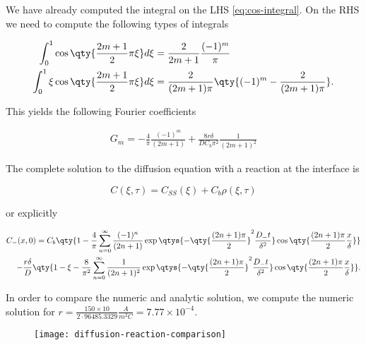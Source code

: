 We have already computed the integral on the LHS \ref{eq:cos-integral}. On the RHS we need to compute the following types of integrals

\begin{align}
	\int_0^1 \cos\qty{\frac{2m+1}{2}\pi\xi} d\xi &= \frac{2}{2m+1} \frac{(-1)^m}{\pi}\\
	\int_0^1 \xi \cos\qty{\frac{2m+1}{2}\pi\xi} d\xi &= \frac{2}{(2m+1)\pi} \qty{(-1)^m -\frac{2}{(2m+1)\pi}}.
\end{align}

This yields the following Fourier coefficients

\begin{align}
	G_m = -\frac{4}{\pi}\frac{(-1)^m}{(2m+1)} + \frac{8r\delta}{DC_b\pi^2}\frac{1}{(2m+1)^2}
\end{align}

The complete solution to the diffusion equation with a reaction at the interface is

$$C(\xi, \tau) = C_{SS}(\xi) + C_b \rho(\xi, \tau)$$

or explicitly

\begin{align}\nonumber
	C_-(x,0) = C_b\qty{1- \frac{4}{\pi} \sum_{n=0}^\infty \frac{(-1)^n}{(2n+1)}\exp\qtys{-\qty{\frac{(2n+1)\pi}{2}}^2\frac{D_- t}{\delta^2}}\cos\qty{\frac{(2n+1)\pi}{2} \frac{x}{\delta}}}\\ -\frac{r\delta}{D}\qty{1-\xi - \frac{8}{\pi^2}\sum_{n=0}^\infty \frac{1}{(2n+1)^2}\exp\qtys{-\qty{\frac{(2n+1)\pi}{2}}^2\frac{D_- t}{\delta^2}}\cos\qty{\frac{(2n+1)\pi}{2} \frac{x}{\delta}}}.
	\label{eq:solution-diffusion}
\end{align}

\newpage
In order to compare the numeric and analytic solution, we compute the numeric solution for $r = \frac{150 \times 10 }{{2 \cdot  96 485.3329 }} \frac{A}{m^2 C} = 7.77\times 10^{-4}$.



\begin{figure}[htbp]
\centering
\texttt{[image: diffusion-reaction-comparison]}
\caption{}
\label{fig:diffusion-reaction-comparison}
\end{figure}


